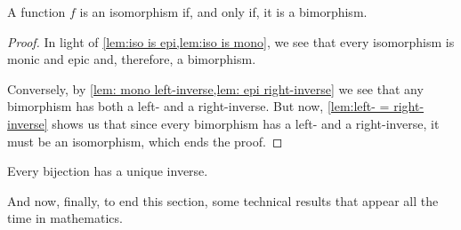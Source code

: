 \begin{theorem}
	A function $f$ is an isomorphism if, and only if, it is a bimorphism.
\end{theorem}
\begin{proof}
	In light of \cref{lem:iso is epi,lem:iso is mono}, we see that every isomorphism is monic and epic and, therefore, a bimorphism.
	
	Conversely, by \cref{lem: mono left-inverse,lem: epi right-inverse} we see that any bimorphism has both a left- and a right-inverse. But now, \cref{lem:left- = right-inverse} shows us that since every bimorphism has a left- and a right-inverse, it must be an isomorphism, which ends the proof.
\end{proof}
\begin{cor}
	Every bijection has a unique inverse.
\end{cor}

And now, finally, to end this section, some technical results that appear all the time in mathematics.

